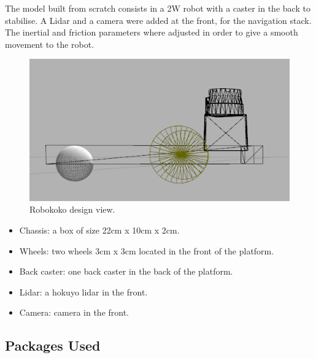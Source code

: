 \documentclass[10pt,journal,compsoc]{IEEEtran}
\begin{document}
The model built from scratch consists in a 2W robot with a caster in the back to stabilise. A Lidar and a camera were added at the front, for the navigation stack. The inertial and friction parameters where adjusted in order to give a smooth movement to the robot.

\begin{figure}[h]
\centering
\includegraphics[scale=0.3]{robokoko-design-2}
\caption{Robokoko design view.}
\label{fig:mesh2}
\end{figure}

\begin{itemize}
\item Chassis: a box of size 22cm x 10cm x 2cm.
\item Wheels: two wheels 3cm x 3cm located in the front of the platform.
\item Back caster: one back caster in the back of the platform.
\item Lidar: a hokuyo lidar in the front.
\item Camera: camera in the front.
\end{itemize}

\subsection{Packages Used}
\end{document}
